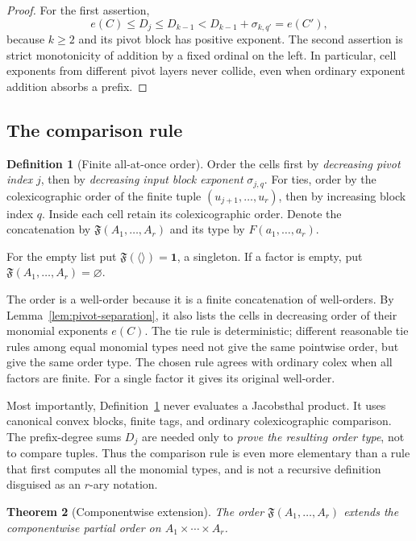 \documentclass[11pt,letterpaper]{article}
\newtheorem{theorem}{Theorem}[section]
\theoremstyle{definition}
\newtheorem{definition}[theorem]{Definition}
\theoremstyle{remark}
\newcommand{\FF}{\mathfrak F}
\newcommand{\one}{\mathbf 1}
\newcommand{\emptyword}{\langle\rangle}
\begin{document}
\begin{proof}
For the first assertion,
\[
 e(C)\leq D_j\leq D_{k-1}<D_{k-1}+\sigma_{k,q'}=e(C'),
\]
because $k\geq2$ and its pivot block has positive exponent. The second
assertion is strict monotonicity of addition by a fixed ordinal on the
left. In particular, cell exponents from different pivot layers never
collide, even when ordinary exponent addition absorbs a prefix.
\end{proof}

\subsection{The comparison rule}

\begin{definition}[Finite all-at-once order]\label{def:F}
Order the cells first by \emph{decreasing pivot index} $j$, then by
\emph{decreasing input block exponent} $\sigma_{j,q}$. For ties, order
by the colexicographic order of the finite tuple
$(u_{j+1},\ldots,u_r)$, then by increasing block index $q$.
Inside each cell retain its colexicographic order. Denote the concatenation
by $\FF(A_1,\ldots,A_r)$ and its type by $F(a_1,\ldots,a_r)$.

For the empty list put $\FF(\emptyword)=\one$, a singleton. If a factor is
empty, put $\FF(A_1,\ldots,A_r)=\varnothing$.
\end{definition}

The order is a well-order because it is a finite concatenation of
well-orders. By Lemma~\ref{lem:pivot-separation}, it also lists the cells
in decreasing order of their monomial exponents $e(C)$. The tie rule is
deterministic; different reasonable tie rules among equal monomial types
need not give the same pointwise order, but give the same order type.
The chosen rule agrees with ordinary colex when all factors are finite.
For a single factor it gives its original well-order.

Most importantly, Definition~\ref{def:F} never evaluates a Jacobsthal
product. It uses canonical convex blocks, finite tags, and ordinary
colexicographic comparison. The prefix-degree sums $D_j$ are needed
only to \emph{prove the resulting order type}, not to compare tuples.
Thus the comparison rule is even more elementary than a rule that first
computes all the monomial types, and is not a recursive definition
disguised as an $r$-ary notation.

\begin{theorem}[Componentwise extension]\label{thm:extension}
The order $\FF(A_1,\ldots,A_r)$ extends the componentwise partial order on
$A_1\times\cdots\times A_r$.
\end{theorem}
\end{document}

